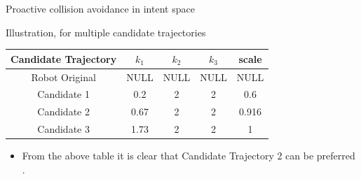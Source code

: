 \documentclass{beamer}
\begin{document}
\begin{frame}{Proactive collision avoidance in intent space}
\begin{block}{Illustration, for multiple candidate trajectories}

\begin{center}
\begin{tabular} { |c|c|c|c|c| }
 \hline
 Candidate Trajectory & $k_1$ & $k_2$ & $k_3$ & scale \\
\hline
 Robot Original  & NULL  & NULL & NULL & NULL  \\
\hline
Candidate 1 & 0.2 & 2 & 2 & 0.6 \\
\hline
Candidate 2 & 0.67 & 2 & 2 & 0.916 \\
\hline
Candidate 3 & 1.73 & 2 & 2 & 1\\
\hline
\end{tabular}
\end{center}
\begin{itemize}
\item{From the above table it is clear that Candidate Trajectory 2 can be preferred .}
\end{itemize}
\end{block}
\end{frame}
\end{document}

